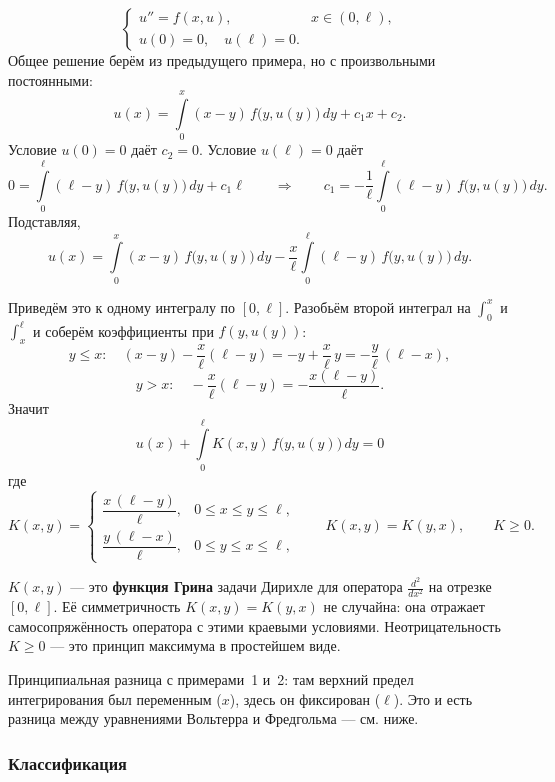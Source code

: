 \begin{example}\label{ex:dirichlet-kernel}
\[
  \begin{cases}
    u'' = f(x,u), & x \in (0,\ell), \\
    u(0) = 0, \quad u(\ell) = 0 .
  \end{cases}
\]
Общее решение берём из предыдущего примера, но с произвольными постоянными:
\[
  u(x) = \int\limits_{0}^{x} (x-y)\, f\big(y,u(y)\big)\, dy + c_1 x + c_2 .
\]
Условие $u(0) = 0$ даёт $c_2 = 0$. Условие $u(\ell) = 0$ даёт
\[
  0 = \int\limits_{0}^{\ell} (\ell-y)\, f\big(y,u(y)\big)\, dy + c_1 \ell
  \qquad\Longrightarrow\qquad
  c_1 = -\frac1\ell \int\limits_{0}^{\ell} (\ell-y)\, f\big(y,u(y)\big)\, dy .
\]
Подставляя,
\[
  u(x) = \int\limits_{0}^{x} (x-y)\, f\big(y,u(y)\big)\, dy
       - \frac{x}{\ell}\int\limits_{0}^{\ell} (\ell-y)\, f\big(y,u(y)\big)\, dy .
\]
\end{example}

Приведём это к одному интегралу по $[0,\ell]$. Разобьём второй интеграл на
$\int_0^x$ и $\int_x^\ell$ и соберём коэффициенты при $f(y,u(y))$:
\[
  y \le x: \quad
  (x-y) - \frac{x}{\ell}(\ell - y) = -y + \frac{x}{\ell}\,y
         = -\frac{y}{\ell}\,(\ell - x) ,
\]
\[
  y > x: \quad
  -\frac{x}{\ell}(\ell - y) = -\frac{x(\ell-y)}{\ell} .
\]
Значит
\[
  \boxed{\ u(x) + \int\limits_{0}^{\ell} K(x,y)\, f\big(y,u(y)\big)\, dy = 0\ }
\]
где
\[
  K(x,y) =
  \begin{cases}
    \dfrac{x\,(\ell - y)}{\ell}, & 0 \le x \le y \le \ell, \\[10pt]
    \dfrac{y\,(\ell - x)}{\ell}, & 0 \le y \le x \le \ell,
  \end{cases}
  \qquad K(x,y) = K(y,x), \qquad K \ge 0 .
\]


\begin{idea}
$K(x,y)$ — это \textbf{функция Грина} задачи Дирихле для оператора
$\frac{d^2}{dx^2}$ на отрезке $[0,\ell]$. Её симметричность $K(x,y)=K(y,x)$ не
случайна: она отражает самосопряжённость оператора с этими краевыми условиями.
Неотрицательность $K \ge 0$ — это принцип максимума в простейшем виде.

\medskip
Принципиальная разница с примерами~1 и~2: там верхний предел интегрирования
был переменным ($x$), здесь он фиксирован ($\ell$). Это и есть разница между
уравнениями Вольтерра и Фредгольма — см. ниже.
\end{idea}

\subsubsection*{Классификация}

